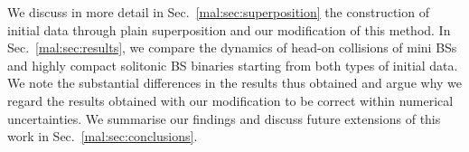 We discuss in more detail
in Sec.~\ref{mal:sec:superposition} the construction of initial
data through plain superposition and our modification of this
method. In Sec.~\ref{mal:sec:results}, we compare the dynamics
of head-on collisions of mini BSs and highly compact solitonic BS
binaries starting from both types of initial data. We note
the substantial differences in the results thus obtained
and argue why we regard the results obtained with our
modification to be correct within numerical uncertainties.
We summarise our findings
and discuss future extensions of this work in
Sec.~\ref{mal:sec:conclusions}.

